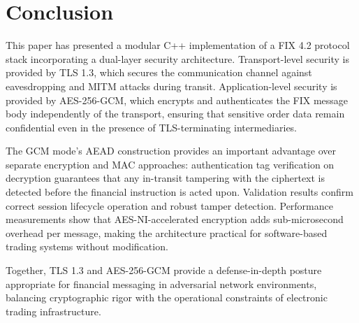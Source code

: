 \documentclass[twocolumn,10pt]{article}
\begin{document}
\section{Conclusion}

This paper has presented a modular C++ implementation of a FIX 4.2 protocol
stack incorporating a dual-layer security architecture. Transport-level
security is provided by TLS 1.3, which secures the communication channel
against eavesdropping and MITM attacks during transit. Application-level
security is provided by AES-256-GCM, which encrypts and authenticates the
FIX message body independently of the transport, ensuring that sensitive
order data remain confidential even in the presence of TLS-terminating
intermediaries.

The GCM mode's AEAD construction provides an important advantage over
separate encryption and MAC approaches: authentication tag verification
on decryption guarantees that any in-transit tampering with the ciphertext
is detected before the financial instruction is acted upon. Validation
results confirm correct session lifecycle operation and robust tamper
detection. Performance measurements show that AES-NI-accelerated
encryption adds sub-microsecond overhead per message, making the architecture
practical for software-based trading systems without modification.

Together, TLS 1.3 and AES-256-GCM provide a defense-in-depth posture
appropriate for financial messaging in adversarial network environments,
balancing cryptographic rigor with the operational constraints of electronic
trading infrastructure.



\end{document}
